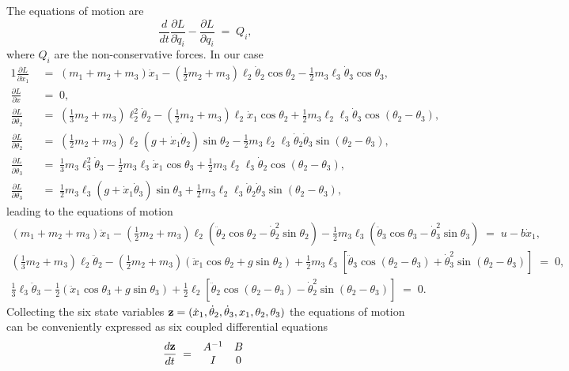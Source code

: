\documentclass{article}
\newcommand{\bfz}{{\bf z}}
\begin{document}
The equations of motion are
\[
\frac{d}{dt}\frac{\partial L}{\partial\dot q_i}-\frac{\partial
  L}{\partial q_i}\;=\;Q_i,
\]
where $Q_i$ are the non-conservative forces. In our case
\begin{alignat}{1}
\frac{\partial L}{\partial\dot x_1}\;&=
\;(m_1+m_2+m_3)\dot x_1-(\tfrac{1}{2}m_2+m_3)\ell_2\dot\theta_2\cos\theta_2-\tfrac{1}{2}m_3\ell_3\dot\theta_3\cos\theta_3,\\
\frac{\partial L}{\partial x}\;&=\;0,\\
\frac{\partial L}{\partial\dot\theta_2}\;&=\;(\tfrac{1}{3}m_2+m_3)\ell_2^2\dot\theta_2 
-(\tfrac{1}{2}m_2+m_3)\ell_2\dot x_1\cos\theta_2+\tfrac{1}{2}m_3\ell_2\ell_3\dot\theta_3\cos(\theta_2-\theta_3),\\
\frac{\partial L}{\partial\theta_2}\;&=\;(\tfrac{1}{2}m_2+m_3)\ell_2(g+\dot x_1\dot\theta_2)\sin\theta_2-
\tfrac{1}{2}m_3\ell_2\ell_3\dot\theta_2\dot\theta_3\sin(\theta_2-\theta_3),\\
\frac{\partial L}{\partial\dot\theta_3}\;&=\;\tfrac{1}{3}m_3\ell_3^2\dot\theta_3 
-\tfrac{1}{2}m_3\ell_3\dot x_1\cos\theta_3+\tfrac{1}{2}m_3\ell_2\ell_3\dot\theta_2\cos(\theta_2-\theta_3),\\
\frac{\partial L}{\partial\theta_3}\;&=\;\tfrac{1}{2}m_3\ell_3(g+\dot x_1\dot\theta_3)\sin\theta_3+
\tfrac{1}{2}m_3\ell_2\ell_3\dot\theta_2\dot\theta_3\sin(\theta_2-\theta_3),
\end{alignat}
leading to the equations of motion
\[
\begin{split}
(m_1+m_2+m_3)\ddot x_1-(\tfrac{1}{2}m_2+m_3)\ell_2(\ddot\theta_2\cos\theta_2-\dot\theta_2^2\sin\theta_2)
-\tfrac{1}2m_3\ell_3(\ddot\theta_3\cos\theta_3-\dot\theta_3^2\sin\theta_3)\;=\;u-b\dot x_1,\\
(\tfrac{1}{3}m_2+m_3)\ell_2\ddot\theta_2-(\tfrac{1}{2}m_2+m_3)(\ddot x_1\cos\theta_2+g\sin\theta_2) 
+\tfrac{1}{2}m_3\ell_3[\ddot\theta_3\cos(\theta_2-\theta_3)+\dot\theta_3^2\sin(\theta_2-\theta_3)]\;=\;0,\\
\tfrac{1}{3}\ell_3\ddot\theta_3-\tfrac{1}{2}(\ddot x_1\cos\theta_3+g\sin\theta_3) 
+\tfrac{1}{2}\ell_2[\ddot\theta_2\cos(\theta_2-\theta_3)-\dot\theta_2^2\sin(\theta_2-\theta_3)]\;=\;0.
\end{split}
\]
Collecting the six state variables $\bfz=(\dot
x_1,\dot\theta_2,\dot\theta_3,x_1,\theta_2,\theta_3)$ the equations of motion can be conveniently
expressed as six coupled differential equations
\[
\frac{d\bfz}{dt}\;=\;\begin{array}{cc}A^{-1}&B\\I&0\end{array}
\]
\end{document}
